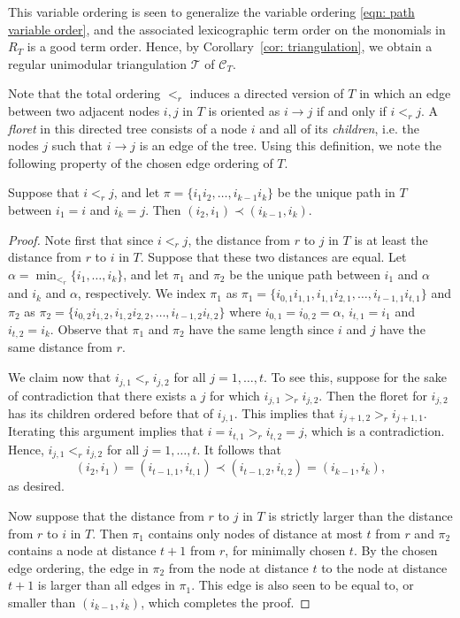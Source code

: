 This variable ordering is seen to generalize the variable ordering \eqref{eqn: path variable order}, and the associated lexicographic term order on the monomials in $R_T$ is a good term order. 
Hence, by Corollary~\ref{cor: triangulation}, we obtain a regular unimodular triangulation $\mathcal{T}$ of $\mathcal{C}_T$. 

Note that the total ordering $<_r$ induces a directed version of $T$ in which an edge between two adjacent nodes $i, j$ in $T$ is oriented as $i\rightarrow j$ if and only if $i <_r j$. 
A \emph{floret} in this directed tree consists of a node $i$ and all of its \emph{children}, i.e. the nodes $j$ such that $i\rightarrow j$ is an edge of the tree. 
Using this definition, we note the following property of the chosen edge ordering of $T$.
\begin{lemm}
    \label{lem: largest edge}
    Suppose that $i <_r j$, and let $\pi = \{i_1i_2,\ldots, i_{k-1}i_k\}$ be the unique path in $T$ between $i_1 = i$ and $i_k = j$. 
    Then $(i_2,i_1) \prec (i_{k-1},i_k)$.  
\end{lemm}

\begin{proof}
Note first that since $i <_r j$, the distance from $r$ to $j$ in $T$ is at least the distance from $r$ to $i$ in $T$.  
Suppose that these two distances are equal.  
Let $\alpha = \min_{<_r}\{i_1,\ldots, i_k\}$, and let $\pi_1$ and $\pi_2$ be the unique path between $i_1$ and $\alpha$ and $i_k$ and $\alpha$, respectively.  
We index $\pi_1$ as $\pi_1 = \{i_{0,1}i_{1,1}, i_{1,1}i_{2,1},\ldots, i_{t-1,1}i_{t,1}\}$ and $\pi_2$ as $\pi_2 = \{i_{0,2}i_{1,2}, i_{1,2}i_{2,2},\ldots, i_{t-1,2}i_{t,2}\}$ where $i_{0,1} = i_{0,2} = \alpha$, $i_{t,1} = i_1$ and $i_{t,2} = i_k$. 
Observe that $\pi_1$ and $\pi_2$ have the same length since $i$ and $j$ have the same distance from $r$.  

We claim now that $i_{j,1} <_r i_{j,2}$ for all $j = 1,\ldots, t$.  
To see this, suppose for the sake of contradiction that there exists a $j$ for which $i_{j,1} >_r i_{j,2}$.  
Then the floret for $i_{j,2}$ has its children ordered before that of $i_{j,1}$.  
This implies that $i_{j+1,2} >_r i_{j+1,1}$.
Iterating this argument implies that $i = i_{t,1} >_r i_{t,2} = j$, which is a contradiction.  
Hence, $i_{j,1} <_r i_{j,2}$ for all $j = 1,\ldots, t$.  
It follows that
\[
(i_2, i_1) = (i_{t-1,1}, i_{t,1}) \prec (i_{t-1,2}, i_{t,2}) = (i_{k-1}, i_k), 
\]
as desired. 

Now suppose that the distance from $r$ to $j$ in $T$ is strictly larger than the distance from $r$ to $i$ in $T$. 
Then $\pi_1$ contains only nodes of distance at most $t$ from $r$ and $\pi_2$ contains a node at distance $t+1$ from $r$, for minimally chosen $t$.  
By the chosen edge ordering, the edge in $\pi_2$ from the node at distance $t$ to the node at distance $t+1$ is larger than all edges in $\pi_1$.  This edge is also seen to be equal to, or smaller than $(i_{k-1},i_k)$, which completes the proof. 
\end{proof}

